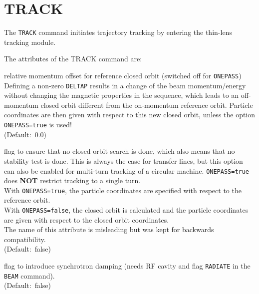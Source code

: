 \section{TRACK}
\label{sec:track}

The {\tt TRACK} command initiates trajectory tracking by entering the 
thin-lens tracking module. 


The attributes of the TRACK command are:

\begin{madlist}
   relative momentum offset for reference closed orbit (switched
  off for {\tt ONEPASS}) \\  
  Defining a non-zero {\tt DELTAP} results in a change of the beam
  momentum/energy without changing the magnetic properties in the
  sequence, which leads to an off-momentum closed orbit different from
  the on-momentum reference orbit. Particle coordinates are then given
  with respect to this new closed orbit, unless the option
  {\tt ONEPASS=true} is used! \\  
  (Default:~0.0)

   flag to ensure that no closed orbit search is done,
  which also means that no stability test is done. This is always the
  case for transfer lines, but this option can also be enabled for
  multi-turn tracking of a circular machine. {\tt ONEPASS=true} does {\bf NOT}
  restrict tracking to a single turn. \\
  With {\tt ONEPASS=true}, the particle coordinates are specified with
  respect to the reference orbit. \\  
  With {\tt ONEPASS=false}, the closed orbit is calculated and the particle
  coordinates are given with respect to the closed orbit coordinates.\\
  The name of this attribute is misleading but was kept for backwards
  compatibility.  \\ 
  (Default:~false)

   flag to introduce synchrotron damping (needs RF cavity
  and flag {\tt RADIATE} in the {\tt BEAM} command). \\ (Default:~false)


\end{madlist}

